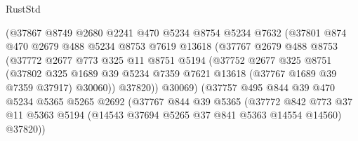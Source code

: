 \begin{lexlean}{RustStd}
\begin{coremodule}
                          (@37867
                            @8749
                            @2680
                            @2241
                            @470
                            @5234
                            @8754
                            @5234
                            @7632
                            (@37801
                              @874
                              @470
                              @2679
                              @488
                              @5234
                              @8753
                              @7619
                              @13618
                              (@37767
                                @2679
                                @488
                                @8753
                                (@37772
                                  @2677
                                  @773
                                  @325
                                  @11
                                  @8751
                                  @5194
                                  (@37752
                                    @2677
                                    @325
                                    @8751
                                    (@37802
                                      @325
                                      @1689
                                      @39
                                      @5234
                                      @7359
                                      @7621
                                      @13618
                                      (@37767 @1689 @39 @7359 @37917)
                                      @30060))
                                  @37820))
                              @30069)
                            (@37757
                              @495
                              @844
                              @39
                              @470
                              @5234
                              @5365
                              @5265
                              @2692
                              (@37767
                                @844
                                @39
                                @5365
                                (@37772
                                  @842
                                  @773
                                  @37
                                  @11
                                  @5363
                                  @5194
                                  (@14543 @37694 @5265 @37 @841 @5363 @14554 @14560)
                                  @37820))

\end{coremodule}
\end{lexlean}
